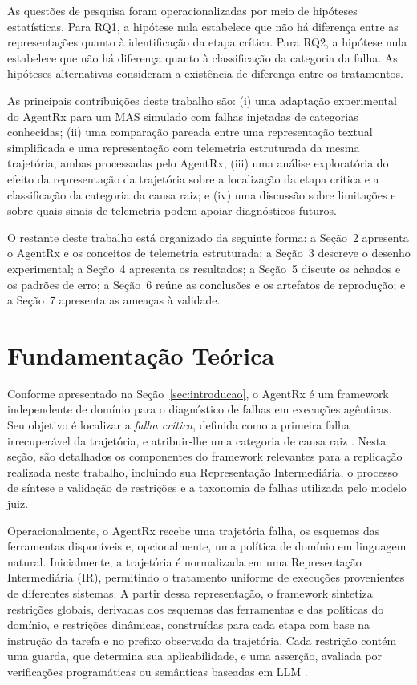 \documentclass[sigconf]{acmart}
\begin{document}
As questões de pesquisa foram operacionalizadas por meio de hipóteses estatísticas. Para RQ1, a hipótese nula
estabelece que não há diferença entre as representações quanto à identificação da etapa crítica. Para RQ2, a hipótese
nula estabelece que não há diferença quanto à classificação da categoria da falha. As hipóteses alternativas consideram
a existência de diferença entre os tratamentos.

As principais contribuições deste trabalho são: (i) uma adaptação experimental do AgentRx para um MAS simulado com
falhas injetadas de categorias conhecidas; (ii) uma comparação pareada entre uma representação textual simplificada e
uma representação com telemetria estruturada da mesma trajetória, ambas processadas pelo AgentRx; (iii) uma análise
exploratória do efeito da representação da trajetória sobre a localização da etapa crítica e a classificação da
categoria da causa raiz; e (iv) uma discussão sobre limitações e sobre quais sinais de telemetria podem apoiar
diagnósticos futuros.

O restante deste trabalho está organizado da seguinte forma: a Seção~2 apresenta o AgentRx e os conceitos de telemetria
estruturada; a Seção~3 descreve o desenho experimental; a Seção~4 apresenta os resultados; a Seção~5 discute os achados
e os padrões de erro; a Seção~6 reúne as conclusões e os artefatos de reprodução; e a Seção~7 apresenta as ameaças à
validade.

\section{Fundamentação Teórica}

Conforme apresentado na Seção~\ref{sec:introducao}, o AgentRx é um framework independente de domínio para o diagnóstico
de falhas em execuções agênticas. Seu objetivo é localizar a \textit{falha crítica}, definida como a primeira falha
irrecuperável da trajetória, e atribuir-lhe uma categoria de causa raiz \cite{barke2026agentrx}. Nesta seção, são
detalhados os componentes do framework relevantes para a replicação realizada neste trabalho, incluindo sua
Representação Intermediária, o processo de síntese e validação de restrições e a taxonomia de falhas utilizada pelo
modelo juiz.

Operacionalmente, o AgentRx recebe uma trajetória falha, os esquemas das ferramentas disponíveis e, opcionalmente, uma
política de domínio em linguagem natural. Inicialmente, a trajetória é normalizada em uma Representação Intermediária
(IR), permitindo o tratamento uniforme de execuções provenientes de diferentes sistemas. A partir dessa representação,
o framework sintetiza restrições globais, derivadas dos esquemas das ferramentas e das políticas do domínio, e
restrições dinâmicas, construídas para cada etapa com base na instrução da tarefa e no prefixo observado da trajetória.
Cada restrição contém uma guarda, que determina sua aplicabilidade, e uma asserção, avaliada por verificações
programáticas ou semânticas baseadas em LLM \cite{barke2026agentrx}.
\end{document}
